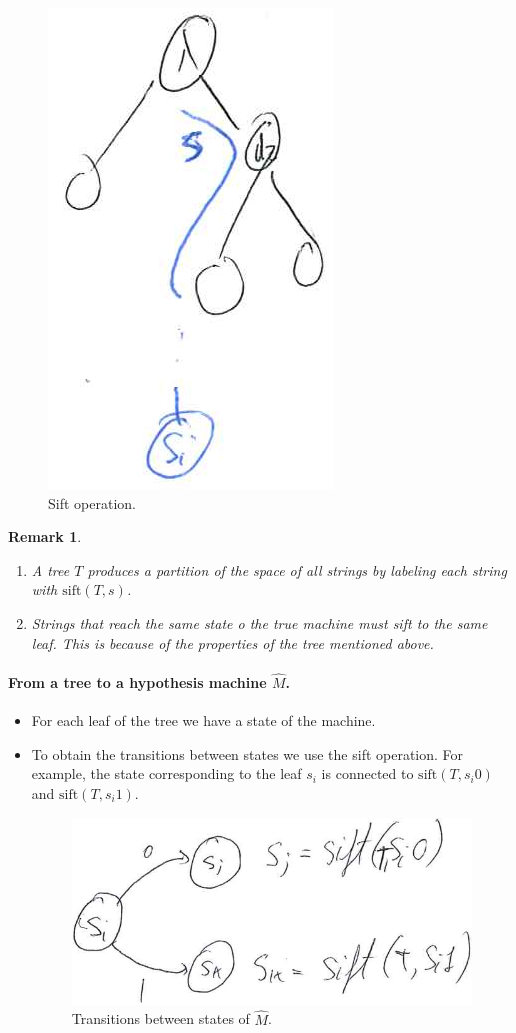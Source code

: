 \documentclass[12pt, letterpaper]{article}
\numberwithin{equation}{section} %
\newcommand{\mr}{\mathrm}
\newtheorem{remark}[theorem]{Remark}
\theoremstyle{definition}
\theoremstyle{remark}
\begin{document}
\begin{enumerate}
    \begin{figure}[H]
    \centering
    \includegraphics[width=0.1\linewidth]{img/sift-tree.png}
    \caption{Sift operation.}
    \end{figure}
    \begin{remark}~
    \begin{enumerate}[-]
    \item A tree $T$ produces a partition of the space of all strings by labeling each string with $\mr{sift}(T,s)$.
    \item Strings that reach the same state o the true machine must sift to the same leaf. This is because of the properties of the tree mentioned above.
    \end{enumerate}
    \end{remark}
    
    \paragraph{From a tree to a hypothesis machine $\widehat M$.}
    \begin{itemize}
    \item For each leaf of the tree we have a state of the machine.
    \item To obtain the transitions between states we use the sift operation. For example, the state corresponding to the leaf $s_i$ is connected to $\mr{sift}(T, s_i0)$ and  $\mr{sift}(T, s_i1)$.
        \begin{figure}[H]
        \centering
        \includegraphics[width=0.2\linewidth]{img/transitions.png}
        \caption{Transitions between states of $\widehat M$.}
        \end{figure}
    \end{itemize}
    

\end{enumerate}
\end{document}
